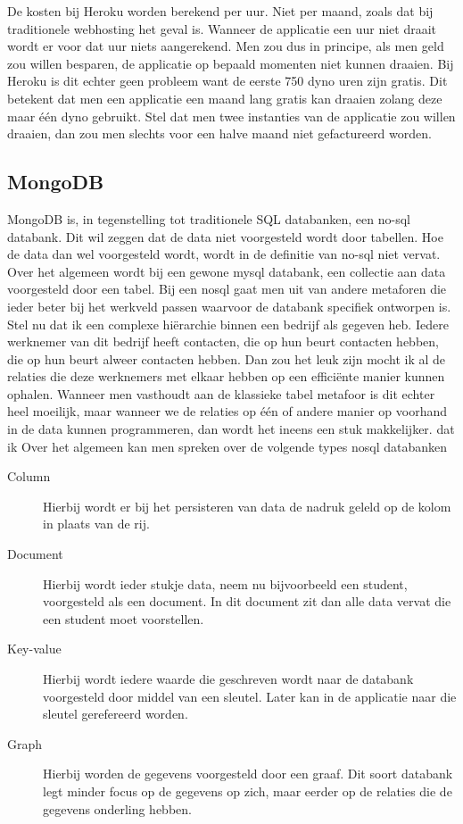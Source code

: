 \documentclass[a4paper,11pt]{article}
\begin{document}
De kosten bij Heroku worden berekend per uur. Niet per maand, zoals dat bij traditionele webhosting het geval is. Wanneer de applicatie een uur niet draait wordt er voor dat uur niets aangerekend. Men zou dus in principe, als men geld zou willen besparen, de applicatie op bepaald momenten niet kunnen draaien. Bij Heroku is dit echter geen probleem want de eerste 750 dyno uren zijn gratis. Dit betekent dat men een  applicatie een maand lang gratis kan draaien zolang deze maar één dyno gebruikt. Stel dat men twee instanties van de applicatie zou willen draaien, dan zou men slechts voor een halve maand niet gefactureerd worden.

\subsection{MongoDB}
MongoDB is, in tegenstelling tot traditionele SQL databanken, een 
no-sql databank. Dit wil zeggen dat de data niet voorgesteld wordt door 
tabellen. Hoe de data dan wel voorgesteld wordt, wordt in de definitie 
van no-sql niet vervat. Over het algemeen wordt bij een gewone mysql 
databank, een collectie aan data voorgesteld door een tabel. Bij een 
nosql gaat men uit van andere metaforen die ieder beter bij het 
werkveld passen waarvoor de databank specifiek ontworpen is. Stel nu 
dat ik een complexe hiërarchie binnen een bedrijf als gegeven heb. 
Iedere werknemer van dit bedrijf heeft contacten, die op hun beurt 
contacten hebben, die op hun beurt alweer contacten hebben. Dan zou 
het leuk zijn mocht ik al de relaties die deze werknemers met elkaar 
hebben op een efficiënte manier kunnen ophalen. Wanneer men vasthoudt 
aan de klassieke tabel metafoor is dit echter heel moeilijk, maar 
wanneer we de relaties op één of andere manier op voorhand in de data 
kunnen programmeren, dan wordt het ineens een stuk makkelijker.
dat ik  Over het algemeen kan men spreken over de 
volgende types nosql databanken

\begin{description}

\item[Column] Hierbij wordt er bij het persisteren van data de nadruk geleld op de kolom in plaats van de rij. %
\item[Document] Hierbij wordt ieder stukje data, neem nu bijvoorbeeld 
een student, voorgesteld als een document. In dit document zit dan alle 
data vervat die een student moet voorstellen.
\item[Key-value] Hierbij wordt iedere waarde die geschreven wordt naar de databank voorgesteld door middel van een sleutel. Later kan in de applicatie naar die sleutel gerefereerd worden.
\item[Graph] Hierbij worden de gegevens voorgesteld door een graaf. Dit soort databank legt minder focus op de gegevens op zich, maar eerder op de relaties die de gegevens onderling hebben. %
\end{description}
\end{document}
